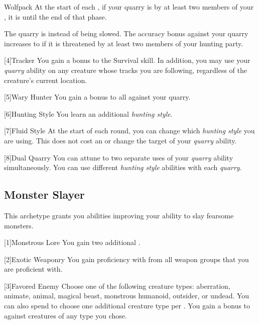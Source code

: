 {            \begin{freeability}{Wolfpack}
                At the start of each , if your quarry is  by at least two members of your , it is  until the end of that phase.

                \rankline
                 The quarry is  instead of being slowed.
                 The accuracy bonus against your quarry increases to  if it is threatened by at least two members of your hunting party.
            \end{freeability}
        }

        [4]{Tracker} You gain a  bonus to the Survival skill.
        In addition, you may use your \textit{quarry} ability on any creature whose tracks you are following, regardless of the creature's current location.

        [5]{Wary Hunter} You gain a  bonus to all  against your quarry.

        [6]{Hunting Style}
        You learn an additional \textit{hunting style}.

        [7]{Fluid Style}
        At the start of each round, you can change which \textit{hunting style} you are using.
        This does not cost an  or change the target of your \textit{quarry} ability.

        [8]{Dual Quarry} You can attune to two separate uses of your \textit{quarry} ability simultaneously.
        You can use different \textit{hunting style} abilities with each \textit{quarry}.

    \subsection{Monster Slayer}
        This archetype grants you abilities improving your ability to slay fearsome monsters.

        [1]{Monstrous Lore} You gain two additional .

        [2]{Exotic Weaponry} You gain proficiency with  from all weapon groups that you are proficient with.

        [3]{Favored Enemy} Choose one of the following creature types: aberration, animate, animal, magical beast, monstrous humanoid, outsider, or undead.
        You can also spend  to choose one additional creature type per .
        You gain a  bonus to  against creatures of any type you chose.

